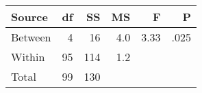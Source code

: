 \documentclass[onecolumn,10pt]{jhwhw}
\begin{document}
\begin{center}
\begin{tabular}{l r r r r r}
\toprule
Source & df & SS & MS & F & P \\
\midrule
Between &  4 &  16 & 4.0 & 3.33 & .025 \\
Within  & 95 & 114 & 1.2 & & \\
Total   & 99 & 130 &     & & \\
\bottomrule
\end{tabular}
\end{center}
\end{document}
